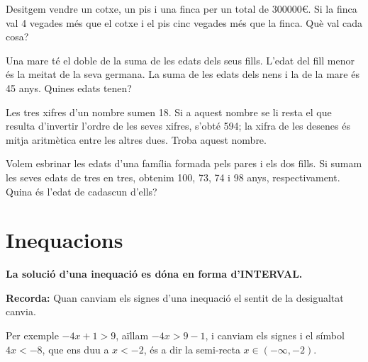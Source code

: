 \begin{mylist}
\exer  Desitgem vendre un cotxe, un pis i una finca per un total de 300000\euro. Si la finca val 4 vegades més que el cotxe i el pis cinc vegades més que la finca. Què val cada cosa?
 
	\exer  Una mare té el doble de la suma de les edats dels seus fills. L'edat del fill menor és la meitat de la seva germana. La suma de les edats dels nens i la de la mare és 45 anys. Quines edats tenen?
	 
	
	\exer  Les tres xifres d'un nombre sumen 18.  Si a aquest nombre se li resta el que resulta d'invertir l'ordre de les seves xifres, s'obté 594; la xifra de les desenes és mitja aritmètica entre les altres dues. Troba aquest nombre.
	
	
	\exer  Volem esbrinar les edats d'una família formada pels pares i els dos fills. Si sumam les seves edats de tres en tres, obtenim 100, 73, 74 i 98 anys, respectivament. Quina és l'edat de cadascun d'ells?

\end{mylist}
 
\section{Inequacions}

\begin{theorybox}
	
	
	\textbf{La solució d'una inequació es dóna en forma d'INTERVAL.}
	
	\textbf{Recorda:} Quan canviam els signes d'una inequació el sentit de la desigualtat canvia.
	
	Per exemple  $-4x + 1 > 9$, aïllam $-4x > 9-1$, i canviam els signes i el símbol $4x < -8$, que ens duu a $x<-2$, és a dir la semi-recta  $x\in (-\infty, -2)$.
\end{theorybox}

